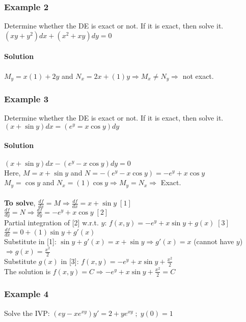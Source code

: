 \documentclass{article}
\begin{document}
\subsubsection{Example 2}
Determine whether the DE is exact or not. If it is exact, then solve it. $(xy+y^2)dx+(x^2+xy)dy=0$

\paragraph{Solution} $M_y=x(1)+2y$ and $N_x=2x+(1)y \Rightarrow M_x\ne N_y\Rightarrow$ not exact.

\subsubsection{Example 3}
Determine whether the DE is exact or not. If it is exact, then solve it. $(x+\sin{y})dx=(e^y=x\cos{y})dy$

\newpage\paragraph{Solution} $(x+\sin{y})dx-(e^y-x\cos{y})dy=0$
\\Here, $M=x+\sin{y}$ and $N=-(e^y-x\cos{y})=-e^y+x\cos{y}$
\\$M_y=\cos{y}$ and $N_x=(1)\cos{y}\Rightarrow M_y=N_x\Rightarrow$ Exact.
\\\\\textbf{To solve}, $\frac{df}{dx}=M\Rightarrow\frac{df}{dx}=x+\sin{y}\;[1]$
\\$\frac{df}{dy}=N\Rightarrow\frac{df}{dy}=-e^y+x\cos{y}\;[2]$
\\Partial integration of [2] w.r.t. $y$: $f(x,y)=-e^y+x\sin{y}+g(x)\;[3]$
\\$\frac{df}{dx}=0+(1)\sin{y}+g'(x)$
\\Substitute in [1]: $\sin{y}+g'(x)=x+\sin{y}\Rightarrow g'(x)=x$ (cannot have $y$) $\Rightarrow g(x)=\frac{x^2}{2}$
\\Substitute $g(x)$ in [3]: $f(x,y)=-e^y+x\sin{y}+\frac{x^2}{2}$
\\The solution is $f(x,y)=C\Rightarrow -e^y+x\sin{y}+\frac{x^2}{2}=C$

\subsubsection{Example 4}
Solve the IVP: $(ey-xe^{xy})y'=2+ye^{xy}\;;\;y(0)=1$
\end{document}
